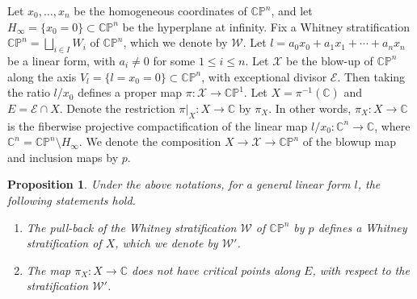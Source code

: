 \documentclass[12pt,leqno,twoside]{amsart}
\theoremstyle{plain}
\newtheorem{prop}[theorem]{Proposition}
\theoremstyle{definition}
\newcommand{\CP}{\mathbb{CP}}
\newcommand{\C}{\mathbb{C}}
\newcommand{\cX}{\mathcal{X}}
\newcommand{\cE}{\mathcal{E}}
\begin{document}
Let $x_0, \dots, x_n$ be the homogeneous coordinates of $\CP^n$, and let $H_\infty=\{x_0=0\}\subset \CP^n$ be the hyperplane at infinity. Fix a Whitney stratification $\CP^n=\bigsqcup_{i\in I} W_i$ of $\CP^n$, which we denote by $\mathcal{W}$. Let $l=a_0x_0+a_1x_1+\cdots +a_nx_n$ be a linear form, with $a_i\neq 0$ for some $1\leq i\leq n$. Let $\cX$ be the blow-up of $\CP^n$ along the axis $V_l=\{l=x_0=0\}\subset \CP^n$, with exceptional divisor $\cE$. Then taking the ratio $l/x_0$ defines a proper map $\pi: \cX\to \CP^1$. Let $X=\pi^{-1}(\C)$ and $E=\cE\cap X$. Denote the restriction $\pi|_{X}: X\to \C$ by $\pi_X$. In other words, $\pi_X: X\to \C$ is the fiberwise projective compactification of the linear map $l/x_0: \C^n\to \C$, where $\C^n=\CP^n\setminus H_\infty$. We denote the composition $X\to \cX\to \CP^n$ of the blowup map and inclusion maps by $p$. 
\begin{prop}\label{propA}
Under the above notations, for a general linear form $l$, the following statements hold.
\begin{enumerate}
\item The pull-back of the Whitney stratification $\mathcal{W}$ of $\CP^n$ by $p$ defines a Whitney stratification of $X$, which we denote by $\mathcal{W}'$. 
\item The map $\pi_X\colon X\to \C$ does not have critical points along $E$, with respect to the stratification $\mathcal{W}'$. 
\end{enumerate}
\end{prop}
\end{document}
